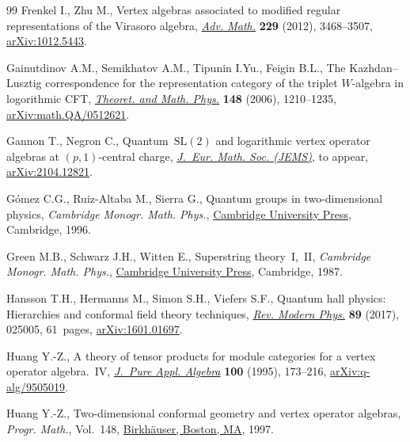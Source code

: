 \begin{thebibliography}{99}
Frenkel I., Zhu M., Vertex algebras associated to modified regular
 representations of the {V}irasoro algebra,
 \href{https://doi.org/10.1016/j.aim.2012.02.008}{\textit{Adv. Math.}}
 \textbf{229} (2012), 3468--3507,
 \href{http://arxiv.org/abs/1012.5443}{arXiv:1012.5443}.

Gainutdinov A.M., Semikhatov A.M., Tipunin I.Yu., Feigin B.L., The
 {K}azhdan--{L}usztig correspondence for the representation category of the
 triplet {$W$}-algebra in logorithmic {CFT},
 \href{https://doi.org/10.1007/s11232-006-0113-6}{\textit{Theoret. and Math.
 Phys.}} \textbf{148} (2006), 1210--1235,
 \href{http://arxiv.org/abs/math.QA/0512621}{arXiv:math.QA/0512621}.

Gannon T., Negron C., Quantum~$\mathrm{SL}(2)$ and logarithmic vertex operator
 algebras at $(p,1)$-central charge,
 \href{https://doi.org/10.4171/JEMS/1489}{\textit{J.~Eur. Math. Soc. (JEMS)}},
{t}o appear,
 \href{http://arxiv.org/abs/2104.12821}{arXiv:2104.12821}.

G\'omez C.G., Ruiz-Altaba M., Sierra G., Quantum groups in two-dimensional
 physics, \textit{Cambridge Monogr. Math. Phys.},
 \href{https://doi.org/10.1017/CBO9780511628825}{Cambridge University Press}, Cambridge,
 1996.

Green M.B., Schwarz J.H., Witten E., Superstring theory~I,~II, \textit{Cambridge
 Monogr. Math. Phys.}, \href{https://doi.org/10.1002/asna.2113090428}{Cambridge
 University Press}, Cambridge, 1987.

Hansson T.H., Hermanns M., Simon S.H., Viefers S.F., Quantum hall physics: {H}ierarchies and conformal field theory techniques,
 \href{https://doi.org/10.1103/RevModPhys.89.025005}{\textit{Rev. Modern
 Phys.}} \textbf{89} (2017), 025005, 61~pages,
 \href{http://arxiv.org/abs/1601.01697}{arXiv:1601.01697}.

Huang Y.-Z., A theory of tensor products for module categories for a vertex
 operator algebra.~{IV},
 \href{https://doi.org/10.1016/0022-4049(95)00050-7}{\textit{J.~Pure Appl.
 Algebra}} \textbf{100} (1995), 173--216,
 \href{http://arxiv.org/abs/q-alg/9505019}{arXiv:q-alg/9505019}.

Huang Y.-Z., Two-dimensional conformal geometry and vertex operator algebras,
 \textit{Progr. Math.}, Vol.~148,
 \href{https://doi.org/10.1007/978-1-4612-4276-5}{Birkh\"auser, Boston, MA},
 1997.


\end{thebibliography}
